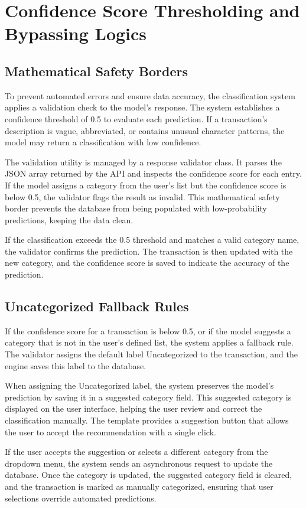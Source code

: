 \section{Confidence Score Thresholding and Bypassing Logics}
\subsection{Mathematical Safety Borders}
To prevent automated errors and ensure data accuracy, the classification system applies a validation check to the model's response. The system establishes a confidence threshold of 0.5 to evaluate each prediction. If a transaction's description is vague, abbreviated, or contains unusual character patterns, the model may return a classification with low confidence.

The validation utility is managed by a response validator class. It parses the JSON array returned by the API and inspects the confidence score for each entry. If the model assigns a category from the user's list but the confidence score is below 0.5, the validator flags the result as invalid. This mathematical safety border prevents the database from being populated with low-probability predictions, keeping the data clean.

If the classification exceeds the 0.5 threshold and matches a valid category name, the validator confirms the prediction. The transaction is then updated with the new category, and the confidence score is saved to indicate the accuracy of the prediction.

\subsection{Uncategorized Fallback Rules}
If the confidence score for a transaction is below 0.5, or if the model suggests a category that is not in the user's defined list, the system applies a fallback rule. The validator assigns the default label Uncategorized to the transaction, and the engine saves this label to the database.

When assigning the Uncategorized label, the system preserves the model's prediction by saving it in a suggested category field. This suggested category is displayed on the user interface, helping the user review and correct the classification manually. The template provides a suggestion button that allows the user to accept the recommendation with a single click.

If the user accepts the suggestion or selects a different category from the dropdown menu, the system sends an asynchronous request to update the database. Once the category is updated, the suggested category field is cleared, and the transaction is marked as manually categorized, ensuring that user selections override automated predictions.

